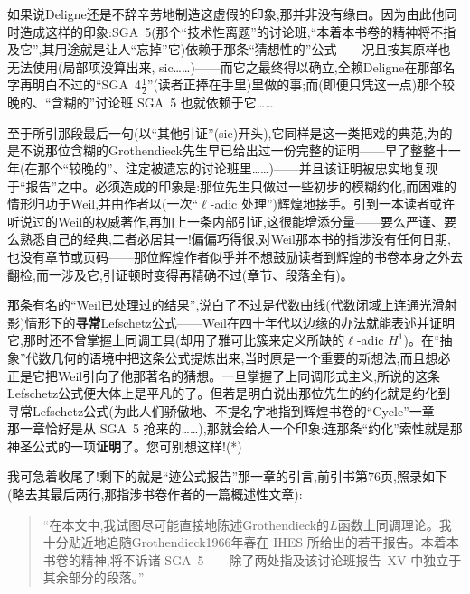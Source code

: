 如果说Deligne还是不辞辛劳地制造这虚假的印象,那并非没有缘由。因为由此他同时造成这样的印象:SGA~5(那个“技术性离题”的讨论班,“本着本书卷的精神将不指及它”,其用途就是让人“忘掉”它)依赖于那条“猜想性的”公式——况且按其原样也无法使用(局部项没算出来, sic……)——而它之最终得以确立,全赖Deligne在那部名字再明白不过的“SGA~4$\frac{1}{2}$”(读者正捧在手里)里做的事;而(即便只凭这一点)那个较晚的、“含糊的”讨论班 SGA~5 也就依赖于它……

至于所引那段最后一句(以“其他引证”(sic)开头),它同样是这一类把戏的典范,为的是不说那位含糊的Grothendieck先生早已给出过一份完整的证明——早了整整十一\dmark{}年(在那个“较晚的”、注定被遗忘的讨论班里……)——并且该证明被忠实地复现于“报告”之中。必须造成的印象是:那位先生只做过一些初步的模糊约化,而困难的情形归功于Weil,并由作者以(一次“$\ell$-adic 处理”)辉煌地接手。引到一本读者或许听说过的Weil的权威著作,再加上一条内部引证,这很能增添分量——要么严谨、要么熟悉自己的经典,二者必居其一!偏偏巧得很,对Weil那本书的指涉没有任何日期,也没有章节或页码——那位辉煌作者似乎并不想鼓励读者到辉煌的书卷本身之外去翻检,而一涉及它,引证顿时变得再精确不过(章节、段落全有)。

那条有名的“Weil已处理过的结果”,说白了不过是代数曲线(代数闭域上连通光滑射影)情形下的\textbf{寻常}Lefschetz公式——Weil在四十年代以边缘的办法就能表述并证明它,那时还不曾掌握上同调工具(却用了雅可比簇来定义所缺的$\ell$-adic $H^1$)。在“抽象”代数几何的语境中把这条公式提炼出来,当时原是一个重要的新想法,而且想必正是它把Weil引向了他那著名的猜想。一旦掌握了上同调形式主义,所说的这条Lefschetz公式便大体上是平凡的了。但若是明白说出那位先生的约化就是约化到寻常Lefschetz公式(为此人们骄傲地、不提名字地指到辉煌书卷的“Cycle”一章——那一章恰好是从 SGA~5 抢来的……),那就会给人一个印象:连那条“约化”索性就是那神圣公式的一项\textbf{证明}了。您可别想这样!(*)

我可急着收尾了!剩下的就是“迹公式报告”那一章的引言,前引书第76页,照录如下(略去其最后两行,那指涉书卷作者的一篇概述性文章):

\begin{quote}
“在本文中,我试图尽可能直接地陈述Grothendieck的$L$函数上同调理论。我十分贴近地追随Grothendieck1966年春在 IHES 所给出的若干报告。本着本书卷的精神,将不诉诸 SGA~5——除了两处指及该讨论班报告~XV 中独立于其余部分的段落。”
\end{quote}

